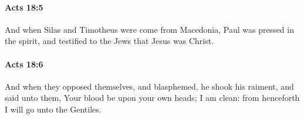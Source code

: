 		\paragraph{Acts 18:5} %
			\label{ACTS-18-5}

			And when Silas and Timotheus were come from Macedonia, Paul was pressed in the spirit, and testified to the Jews that Jesus was Christ.

			\begin{framed}
			\scriptsize
				\begin{compactdesc}
					\item[SBLG] 
				\end{compactdesc}
			\end{framed}

		\paragraph{Acts 18:6} %
			\label{ACTS-18-6}

			And when they opposed themselves, and blasphemed, he shook his raiment, and said unto them, Your blood be upon your own heads; I am clean: from henceforth I will go unto the Gentiles.

